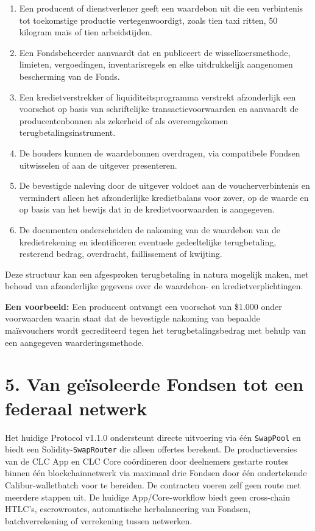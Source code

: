 \documentclass[11pt]{article}
\begin{document}
\begin{enumerate}[leftmargin=*]
\item Een producent of dienstverlener geeft een waardebon uit die een verbintenis tot toekomstige productie vertegenwoordigt, zoals tien taxi ritten, 50 kilogram maïs of tien arbeidstijden.
\item Een Fondsbeheerder aanvaardt dat en publiceert de wisselkoersmethode, limieten, vergoedingen, inventarisregels en elke uitdrukkelijk aangenomen bescherming van de Fonds.
\item Een kredietverstrekker of liquiditeitsprogramma verstrekt afzonderlijk een voorschot op basis van schriftelijke transactievoorwaarden en aanvaardt de producentenbonnen als zekerheid of als overeengekomen terugbetalingsinstrument.
\item De houders kunnen de waardebonnen overdragen, via compatibele Fondsen uitwisselen of aan de uitgever presenteren.
\item De bevestigde naleving door de uitgever voldoet aan de voucherverbintenis en vermindert alleen het afzonderlijke kredietbalans voor zover, op de waarde en op basis van het bewijs dat in de kredietvoorwaarden is aangegeven.
\item De documenten onderscheiden de nakoming van de waardebon van de kredietrekening en identificeren eventuele gedeeltelijke terugbetaling, resterend bedrag, overdracht, faillissement of kwijting.
\end{enumerate}
Deze structuur kan een afgesproken terugbetaling in natura mogelijk maken, met behoud van afzonderlijke gegevens over de waardebon- en kredietverplichtingen.

\textbf{Een voorbeeld:} Een producent ontvangt een voorschot van \$1.000 onder voorwaarden waarin staat dat de bevestigde nakoming van bepaalde maïsvouchers wordt gecrediteerd tegen het terugbetalingsbedrag met behulp van een aangegeven waarderingsmethode.


\section*{5. Van geïsoleerde Fondsen tot een federaal netwerk}

Het huidige Protocol v1.1.0 ondersteunt directe uitvoering via één \texttt{SwapPool} en biedt een Solidity-\texttt{SwapRouter} die alleen offertes berekent. De productieversies van de CLC App en CLC Core coördineren door deelnemers gestarte routes binnen één blockchainnetwerk via maximaal drie Fondsen door één ondertekende Calibur-walletbatch voor te bereiden. De contracten voeren zelf geen route met meerdere stappen uit. De huidige App/Core-workflow biedt geen cross-chain HTLC's, escrowroutes, automatische herbalancering van Fondsen, batchverrekening of verrekening tussen netwerken.
\end{document}
